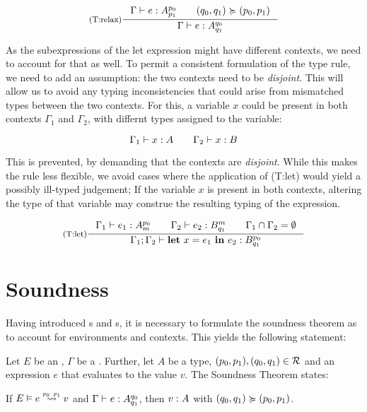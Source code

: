 \[
   \inference[(T:relax)]
   {\typing{\Gamma}{e}{\ratype{A}{p_0}{p_1}} \qquad (q_0, q_1) \relaxation (p_0, p_1)}
   {\typing{\Gamma}{e}{\ratype{A}{q_0}{q_1}}}
\]

As the subexpressions of the let expression might have different contexts, we need to account for that as well. To permit a consistent formulation of the type rule, we need to add an assumption: the two contexts need to be \emph{disjoint}. This will allow us to avoid any typing inconsistencies that could arise from mismatched types between the two contexts. 
For this, a variable \(x\) could be present in both contexts \(\Gamma_1\) and \(\Gamma_2\), with differnt types assigned to the variable:

\[
   \Gamma_1 \vdash x : A \qquad \Gamma_2 \vdash x : B
\]

This is prevented, by demanding that the contexts are \emph{disjoint}. While this makes the rule less flexible, we avoid cases where the application of (T:let) would yield a possibly ill-typed judgement; If the variable \(x\) is present in both contexts, altering the type of that variable may construe the resulting typing of the expression.

\[
   \inference[(T:let)]
   {\typing{\Gamma_1}{e_1}{\ratype{A}{p_0}{m}} \qquad \typing{\Gamma_2}{e_2}{\ratype{B}{m}{q_1}} \qquad \Gamma_1 \cap \Gamma_2 = \emptyset}
   {\typing{\Gamma_1; \Gamma_2}{\letexp{x}{e_1}{e_2}}{\ratype{B}{p_0}{q_1}}}
\]


\section{Soundness}

Having introduced s and s, it is necessary to formulate the soundness theorem as to account for environments and contexts. This yields the following statement:

\begin{theorem}\label{thm:soundness-5}
   Let \(E\) be an , \(\Gamma\) be a . Further, let \(A\) be a type, \((p_0, p_1), (q_0, q_1) \in \mathcal{R}\) and an expression \(e\) that evaluates to the value \(v\). The Soundness Theorem states:

   \begin{center}
   If \(\evals{E}{e}{v}{p_0}{p_1}\) and \(\Gamma \vdash e : A ^{q_0}_{q_1}\), then \(v : A ^{}_{}\) with \((q_0, q_1) \succcurlyeq (p_0, p_1)\).
   \end{center}
\end{theorem}

